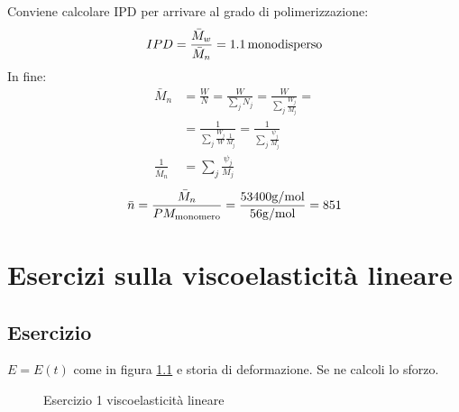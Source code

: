 Conviene calcolare \ac{IPD} per arrivare al grado di polimerizzazione:
\begin{equation}
IPD = \frac{\bar{M}_w}{\bar{M}_n} = 1.1\,\textup{monodisperso}
\end{equation}
In fine:
\begin{equation}
\begin{split}
\bar{M}_n &= \frac{W}{N} = \frac{W}{\sum_j{N_j}} = \frac{W}{\sum_j{\frac{W_j}{M_j}}} =\\
&= \frac{1}{\sum_j{\frac{W_j}{W}\frac{1}{M_j}}} = \frac{1}{\sum_j{\frac{\psi_j}{M_j}}}\\
\frac{1}{\bar{M}_n} &= \sum_j{\frac{\psi_j}{M_j}}
\end{split}
\end{equation}
\begin{equation}
\bar{n} = \frac{\bar{M}_n}{PM_{\textup{monomero}}} = \frac{53400\unit{\g/\mol}}{56\unit{\g/\mol}} = 851
\end{equation}


\chapter{Esercizi sulla viscoelasticità lineare}\label{chp:VisElastLineare}
\section{Esercizio}
$E = E(t)$ come in figura \ref{fig:Esercizio1} e storia di deformazione.
Se ne calcoli lo sforzo.

\begin{figure}
\centering
{}\quad
{}
\caption{Esercizio 1 viscoelasticità lineare}
\label{fig:Esercizio1}
\end{figure}

